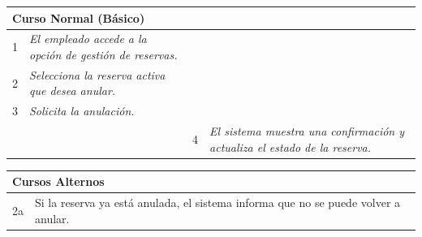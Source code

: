 \begin{table}[H]
    \begin{tabular}{llllllll}
    \hline
    \multicolumn{8}{|l|}{\cellcolor[HTML]{F2F2F2}Curso Normal (Básico)} \\ \hline
    \multicolumn{1}{|c|}{1} & \multicolumn{1}{p{6cm}|}{{\color[HTML]{808080} \textit{El empleado accede a la opción de gestión de reservas.}}} & \multicolumn{1}{c|}{} & \multicolumn{5}{p{6cm}|}{} \\ \hline
    \multicolumn{1}{|c|}{2} & \multicolumn{1}{p{6cm}|}{{\color[HTML]{808080} \textit{Selecciona la reserva activa que desea anular.}}} & \multicolumn{1}{c|}{} & \multicolumn{5}{p{6cm}|}{} \\ \hline
    \multicolumn{1}{|c|}{3} & \multicolumn{1}{p{6cm}|}{{\color[HTML]{808080} \textit{Solicita la anulación.}}} & \multicolumn{1}{c|}{} & \multicolumn{5}{p{6cm}|}{} \\ \hline
    \multicolumn{1}{|c|}{} & \multicolumn{1}{p{6cm}|}{} & \multicolumn{1}{c|}{4} & \multicolumn{5}{p{6cm}|}{{\color[HTML]{808080} \textit{El sistema muestra una confirmación y actualiza el estado de la reserva.}}} \\ \hline
    \end{tabular}
    
\end{table}



\begin{table}[H]
    \begin{tabular}{llllllll}
    \hline
    \multicolumn{8}{|l|}{\cellcolor[HTML]{F2F2F2}Cursos Alternos}                                                                                                                                                                                                                                                                                \\ \hline
    \multicolumn{1}{|c|}{2a} & \multicolumn{7}{p{15cm}|}{{\color[HTML]{808080} Si la reserva ya está anulada, el sistema informa que no se puede volver a anular.}}                                                                                                                                      \\ \hline
    \end{tabular}
\end{table}


